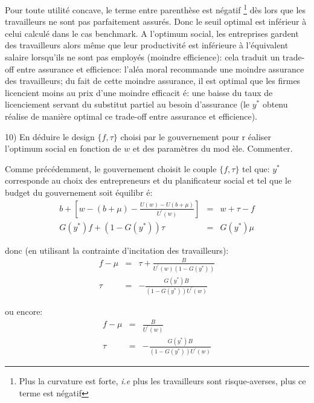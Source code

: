 \documentclass[a4paper]{article}
\begin{document}
Pour toute utilit\'{e} concave, le terme entre parenth\`{e}se est n\'{e}gatif%
\footnote{%
Plus la curvature est forte, \textit{i.e }plus les travailleurs sont
risque-averses, plus ce terme est n\'{e}gatif} d\`{e}s lors que les
travailleurs ne sont pas parfaitement assur\'{e}s. Donc le seuil optimal est
inf\'{e}rieur \`{a} celui calcul\'{e} dans le cas benchmark. A l'optimum
social, les entreprises gardent des travailleurs alors m\^{e}me que leur
productivit\'{e} est inf\'{e}rieure \`{a} l'\'{e}quivalent salaire
lorsqu'ils ne sont pas employ\'{e}s (moindre efficience): cela traduit un
trade-off entre assurance et efficience: l'al\'{e}a moral recommande une
moindre assurance des travailleurs; du fait de cette moindre assurance, il
est optimal que les firmes licencient moins au prix d'une moindre efficacit%
\'{e}: une baisse du taux de licenciement servant du substitut partiel au
besoin d'assurance (le $y^{\ast }$ obtenu r\'{e}alise de mani\`{e}re optimal
ce trade-off entre assurance et efficience).

\bigskip

10) En d\'{e}duire le design $\{f,\tau \}$ choisi par le gouvernement pour r%
\'{e}aliser l'optimum social en fonction de $w$ et des param\`{e}tres du mod%
\`{e}le. Commenter.

\bigskip

Comme pr\'{e}c\'{e}demment, le gouvernement choisit le couple $\{f,\tau \}$
tel que: $y^{\ast }$ corresponde au choix des entrepreneurs et du
planificateur social et tel que le budget du gouvernement soit \'{e}quilibr%
\'{e}:%
\begin{eqnarray*}
b+\left[ w-(b+\mu )-\frac{U(w)-U(b+\mu )}{U^{\prime }(w)}\right] &=&w+\tau -f
\\
G(y^{\ast })f+\left( 1-G(y^{\ast })\right) \tau &=&G(y^{\ast })\mu
\end{eqnarray*}

donc (en utilisant la contrainte d'incitation des travailleurs):%
\begin{eqnarray*}
f-\mu &=&\tau +\frac{B}{U^{\prime }(w)\left( 1-G(y^{\ast })\right) } \\
\tau &=&-\frac{G(y^{\ast })B}{\left( 1-G(y^{\ast })\right) U^{\prime }(w)}
\end{eqnarray*}

ou encore:%
\begin{eqnarray*}
f-\mu &=&\frac{B}{U^{\prime }(w)} \\
\tau &=&-\frac{G(y^{\ast })B}{\left( 1-G(y^{\ast })\right) U^{\prime }(w)}
\end{eqnarray*}
\end{document}
